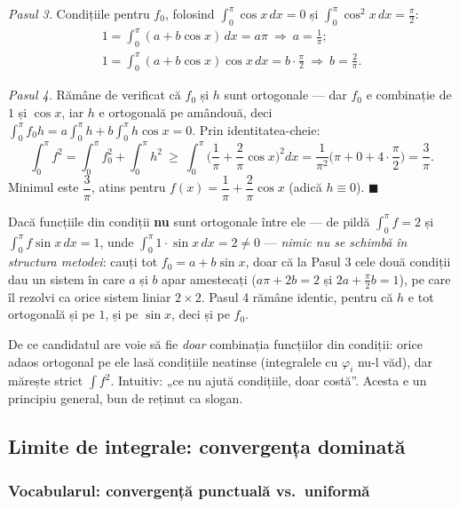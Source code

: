 \emph{Pasul 3.} Condițiile pentru $f_0$, folosind $\int_0^\pi\cos x\,dx=0$ și $\int_0^\pi\cos^2x\,dx=\frac\pi2$:
\[
\begin{gathered}
1=\int_0^\pi(a+b\cos x)\,dx=a\pi\ \Rightarrow\ a=\frac1\pi;\\
1=\int_0^\pi(a+b\cos x)\cos x\,dx=b\cdot\frac\pi2\ \Rightarrow\ b=\frac2\pi.
\end{gathered}
\]

\emph{Pasul 4.} Rămâne de verificat că $f_0$ și $h$ sunt ortogonale --- dar $f_0$ e combinație de $1$ și $\cos x$, iar $h$ e ortogonală pe amândouă, deci $\int_0^\pi f_0h=a\int_0^\pi h+b\int_0^\pi h\cos x=0$. Prin identitatea-cheie:
\[
\int_0^\pi f^2=\int_0^\pi f_0^2+\int_0^\pi h^2\ \ge\ \int_0^\pi\Big(\frac1\pi+\frac2\pi\cos x\Big)^2dx
=\frac{1}{\pi^2}\Big(\pi+0+4\cdot\frac\pi2\Big)=\frac{3}{\pi}.
\]
Minimul este $\boxed{\dfrac3\pi}$, atins pentru $f(x)=\dfrac1\pi+\dfrac2\pi\cos x$ (adică $h\equiv0$). $\blacksquare$

\begin{obs}
Dacă funcțiile din condiții \textbf{nu} sunt ortogonale între ele --- de pildă $\int_0^\pi f=2$ și $\int_0^\pi f\sin x\,dx=1$, unde $\int_0^\pi 1\cdot\sin x\,dx=2 \neq 0$ --- \emph{nimic nu se schimbă în structura metodei}: cauți tot $f_0=a+b\sin x$, doar că la Pasul 3 cele două condiții dau un sistem în care $a$ și $b$ apar amestecați ($a\pi+2b=2$ și $2a+\frac\pi2 b=1$), pe care îl rezolvi ca orice sistem liniar $2\times2$. Pasul 4 rămâne identic, pentru că $h$ e tot ortogonală și pe $1$, și pe $\sin x$, deci și pe $f_0$.
\end{obs}

\begin{obs}
De ce candidatul are voie să fie \emph{doar} combinația funcțiilor din condiții: orice adaos ortogonal pe ele lasă condițiile neatinse (integralele cu $\varphi_i$ nu-l văd), dar mărește strict $\int f^2$. Intuitiv: „ce nu ajută condițiile, doar costă''. Acesta e un principiu general, bun de reținut ca slogan.
\end{obs}


\subsection{Limite de integrale: convergența dominată}

\subsubsection{Vocabularul: convergență punctuală vs.\ uniformă}

